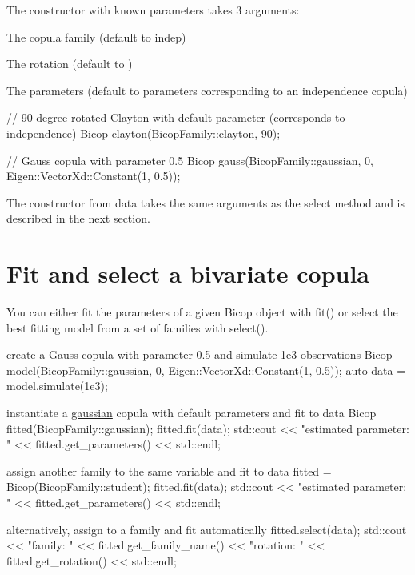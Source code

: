 The constructor with known parameters takes 3 arguments\+:
\begin{DoxyItemize}
\item The copula family (default to {\ttfamily indep})
\item The rotation (default to {})
\item The parameters (default to parameters corresponding to an independence copula)
\end{DoxyItemize}


\begin{DoxyCode}
\textcolor{comment}{// 90 degree rotated Clayton with default parameter (corresponds to independence)}
Bicop \hyperlink{namespacevinecopulib_a42e95cc06d33896199caab0c11ad44f3ad0b8c94bb241f6f7a4b96cd6d3e26c36}{clayton}(BicopFamily::clayton, 90);

\textcolor{comment}{// Gauss copula with parameter 0.5}
Bicop gauss(BicopFamily::gaussian, 0,  Eigen::VectorXd::Constant(1, 0.5));
\end{DoxyCode}
 The constructor from data takes the same arguments as the select method and is described in the next section.\hypertarget{overview-bicop_bicop-fit}{}\section{Fit and select a bivariate copula}\label{overview-bicop_bicop-fit}
You can either fit the parameters of a given {\ttfamily Bicop} object with {\ttfamily fit()} or select the best fitting model from a set of families with {\ttfamily select()}.


\begin{DoxyCode}
create a Gauss copula with parameter 0.5 and simulate 1e3 observations
Bicop model(BicopFamily::gaussian, 0,  Eigen::VectorXd::Constant(1, 0.5));
\textcolor{keyword}{auto} data = model.simulate(1e3);

instantiate a \hyperlink{namespacevinecopulib_a42e95cc06d33896199caab0c11ad44f3a304e2a3b544f6b9f267a151e1bcee487}{gaussian} copula with \textcolor{keywordflow}{default} parameters and fit to data
Bicop fitted(BicopFamily::gaussian);
fitted.fit(data);
std::cout <<
       \textcolor{stringliteral}{"estimated parameter: "} <<
       fitted.get\_parameters() <<
       std::endl;

assign another family to the same variable and fit to data
fitted = Bicop(BicopFamily::student);
fitted.fit(data);
std::cout <<
       \textcolor{stringliteral}{"estimated parameter: "} <<
       fitted.get\_parameters() <<
       std::endl;

alternatively, assign to a family and fit automatically
fitted.select(data);
std::cout <<
       \textcolor{stringliteral}{"family: "} << fitted.get\_family\_name() <<
       \textcolor{stringliteral}{"rotation: "} <<  fitted.get\_rotation() <<
       std::endl;
\end{DoxyCode}


